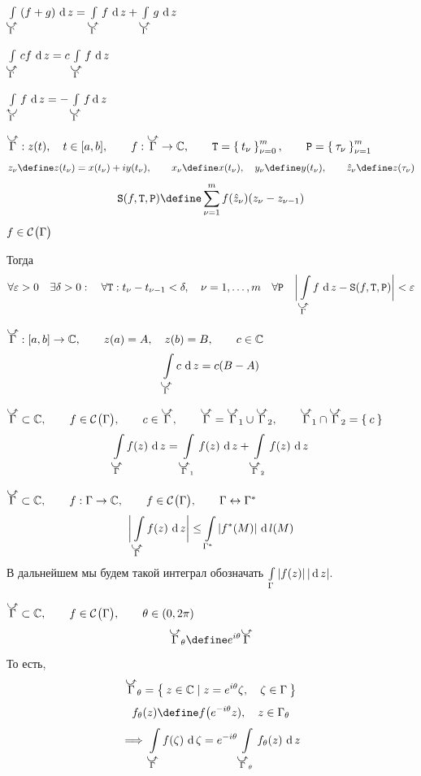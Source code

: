 \begin{props}
	\item $ \cint[z]{\curvedir\Gamma}{(f + g)} = \cint[z]{\curvedir\Gamma}f + \cint[z]{\curvedir\Gamma}g $

	\item $ \cint[z]{\curvedir\Gamma}{cf} = c \cint[z]{\curvedir\Gamma}f $

	\item $ \cint[z]{\curvedir[0]\Gamma}f = - \int\limits_{\curvedir \Gamma} f \di z $

	\item $ \curvedir\Gamma : z(t), \quad t \in [a, b], \qquad f : \curvedir\Gamma \to \Co, \qquad \mathtt T = \seqz[m]{t_\nu}\nu, \qquad \mathtt P = \seq[m]{\tau_\nu}\nu $
	$$ z_\nu \define z(t_\nu) = x(t_\nu) + iy(t_\nu), \qquad x_\nu \define x(t_\nu), \quad y_\nu \define y(t_\nu), \qquad \hat z_\nu \define z(\tau_\nu) $$
	$$ \mathtt S(f, \mathtt T, \mathtt P) \define \sum_{\nu = 1}^m f(\hat z_\nu) (z_\nu - z_{\nu - 1}) $$
	$ f \in \mathcal{C}^{} \big( {\Gamma} \big)  $

	Тогда
	$$ \forall \eps > 0 \quad \exists \delta > 0 : \quad \forall \mathtt T : t_\nu - t_{\nu - 1} < \delta, \quad \nu = 1, \dots, m \quad \forall \mathtt P \quad \bigg| \cint[z]{\curvedir\Gamma}f - \mathtt S(f, \mathtt T, \mathtt P) \bigg| < \eps $$

	\item\label{it:curve_it:5} $ \curvedir\Gamma : [a, b] \to \Co, \qquad z(a) = A, \quad z(b) = B, \qquad c \in \Co $
	$$ \cint[z]{\curvedir\Gamma}c = c(B - A) $$

	\item\label{it:curve_int:6} $ \curvedir \Gamma \sub \Co, \qquad f \in \Cont \Gamma, \qquad c \in \curvedir \Gamma, \qquad \curvedir \Gamma = \curvedir \Gamma_1 \cup \curvedir \Gamma_2, \qquad \curvedir\Gamma_1 \cap \curvedir\Gamma_2 = \set c $
		$$ \cint[z]{\curvedir \Gamma}{f(z)} = \cint[z]{\curvedir\Gamma_1}{f(z)} + \cint[z]{\curvedir\Gamma_2}{f(z)} $$

	\item\label{it:curve_int:7} $ \curvedir\Gamma \sub \Co, \qquad f : \Gamma \to \Co, \qquad f \in \Cont \Gamma, \qquad \Gamma \leftrightarrow \Gamma^* $
	$$ \bigg| \cint[z]{\curvedir\Gamma}{f(z)} \bigg| \le \cint{\Gamma^*}{|f^*(M)|} $$
	В дальнейшем мы будем такой интеграл обозначать $ \int\limits_{\Gamma} {|f(z)|} \, |\operatorname{d} {z}| $.

	\item\label{it:curve_int:8} $ \curvedir\Gamma \sub \Co, \qquad f \in \Cont \Gamma, \qquad \theta \in (0, 2\pi) $
		$$ \curvedir\Gamma_\theta \define e^{i\theta}\curvedir\Gamma $$
		То есть,
		$$ \curvedir\Gamma_\theta = \set{z \in \Co \mid z = e^{i\theta}\zeta, \quad \zeta \in \Gamma} $$
		$$ f_\theta(z) \define f \big( e^{-i\theta}z), \quad z \in \Gamma_\theta $$
		$$ \implies \cint[\zeta]{\curvedir\Gamma}{f(\zeta)} = e^{-i\theta} \cint[z]{\curvedir\Gamma_\theta}{f_\theta(z)} $$
\end{props}

